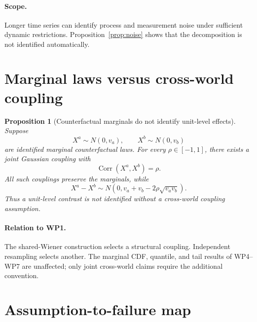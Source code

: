 \documentclass[11pt]{article}
\newtheorem{proposition}[assumption]{Proposition}
\theoremstyle{remark}
\newcommand{\Corr}{\operatorname{Corr}}
\begin{document}
\paragraph{Scope.}
Longer time series can identify process and measurement noise under sufficient dynamic restrictions. Proposition~\ref{prop:noise} shows that the decomposition is not identified automatically.

\section{Marginal laws versus cross-world coupling}

\begin{proposition}[Counterfactual marginals do not identify unit-level effects]\label{prop:coupling}
Suppose
\[
 X^a\sim N(0,v_a),
 \qquad
 X^b\sim N(0,v_b)
\]
are identified marginal counterfactual laws. For every $\rho\in[-1,1]$, there exists a joint Gaussian coupling with
\[
 \Corr(X^a,X^b)=\rho.
\]
All such couplings preserve the marginals, while
\[
 X^a-X^b
 \sim
 N\left(
 0,
 v_a+v_b-2\rho\sqrt{v_av_b}
 \right).
\]
Thus a unit-level contrast is not identified without a cross-world coupling assumption.
\end{proposition}

\paragraph{Relation to WP1.}
The shared-Wiener construction selects a structural coupling. Independent resampling selects another. The marginal CDF, quantile, and tail results of WP4--WP7 are unaffected; only joint cross-world claims require the additional convention.

\section{Assumption-to-failure map}
\end{document}
